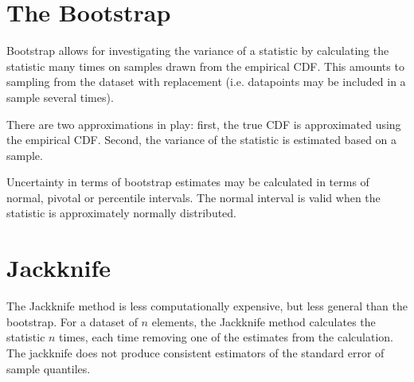 \section{The Bootstrap}

Bootstrap allows for investigating the variance of a statistic by calculating the statistic many times on samples drawn from the empirical CDF. This amounts to sampling from the dataset with replacement (i.e. datapoints may be included in a sample several times).

There are two approximations in play: first, the true CDF is approximated using the empirical CDF. Second, the variance of the statistic is estimated based on a sample.

Uncertainty in terms of bootstrap estimates may be calculated in terms of normal, pivotal or percentile intervals. The normal interval is valid when the statistic is approximately normally distributed.

\section{Jackknife}
The Jackknife method is less computationally expensive, but less general than the bootstrap. For a dataset of $n$ elements, the Jackknife method calculates the statistic $n$ times, each time removing one of the estimates from the calculation. The jackknife does not produce consistent estimators of the standard error of sample quantiles. 
